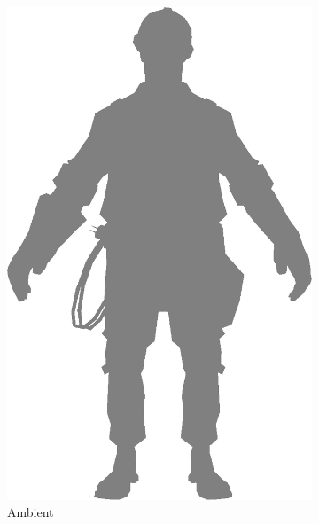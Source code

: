 
\begin{figure}[h]
    \centering
        \begin{subfigure}[b]{0.18\textwidth}
        \includegraphics[width=\textwidth]{img/Lighting/ambient.png}
        \caption{Ambient}
        \label{fig:ambient}
    \end{subfigure}
    ~
    \centering
    \begin{subfigure}[b]{0.18\textwidth}

\end{subfigure}
\end{figure}
